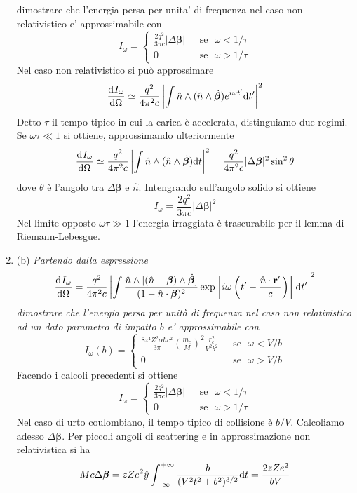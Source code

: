 \documentclass{article}
\renewcommand{\b}{(b)}
\renewcommand{\t}[1]{\textit{ #1}}
\renewcommand{\vec}[1]{\mathbf{#1}}
\begin{document}
\begin{enumerate}
{		dimostrare che
		l’energia persa per unita’ di frequenza nel caso non relativistico e’ approssimabile
		con \[I_\omega=\begin{cases}
		\frac{2q^2}{3\pi c}\left|\Delta\bm{\beta}\right|&\textrm{ }\mathrm{se}\textrm{ }\omega<1/\tau\\0&\textrm{ }\mathrm{se}\textrm{ }\omega>1/\tau
		\end{cases}\]} Nel caso non relativistico si può approssimare
	\[\dfrac{\mathrm{d} ^{}I_\omega}{\mathrm{d} {\Omega}^{}}\simeq\frac{q^2}{4\pi^2c}\left|\int\hat{n}\wedge(\hat{n}\wedge\dot{\bm\beta})e^{i\omega t'}\mathrm{d} t'\right|^2\]
	Detto $\tau$ il tempo tipico in cui la carica è accelerata, distinguiamo due regimi. Se $\omega\tau\ll 1$ si ottiene, approssimando ulteriormente
	\[\dfrac{\mathrm{d} ^{}I_\omega}{\mathrm{d} {\Omega}^{}}\simeq\frac{q^2}{4\pi^2c}\left|\int\hat{n}\wedge(\hat{n}\wedge\dot{\bm\beta})\mathrm{d} t\right|^2=\frac{q^2}{4\pi^2 c}|\Delta\bm\beta|^2\sin^2\theta\]
	dove $\theta$ è l'angolo tra $\Delta\bm\beta$ e $\hat{n}$. Intengrando sull'angolo solido si ottiene
	\[I_\omega=\frac{2q^2}{3\pi c}|\Delta\bm\beta|^2\]
	Nel limite opposto $\omega\tau\gg1$ l'energia irraggiata è trascurabile per il lemma di Riemann-Lebesgue. 
	\item\b\t{Partendo dalla espressione
		\[\der{I_\omega}{\Omega}=\frac{q^2}{4\pi^2c}\left|\int\frac{\hat{n}\wedge[(\hat{n}-\bm{\beta})\wedge\dot{\bm{\beta}}]}{(1-\hat{n}\cdot\bm{\beta})^2}\exp\left[i\omega\left(t'-\frac{\hat{n}\cdot\vec{r}'}{c}\right)\right]\d t'\right|^2\]
		dimostrare che
		l’energia persa per unità di frequenza nel caso non relativistico ad un dato
		parametro di impatto $b$ e’ approssimabile con \[I_\omega(b)=\begin{cases}
		\frac{8z^4Z^2\alpha\hbar c^2}{3\pi}\left(\frac{m_e}{M}\right)^2\frac{r_e^2}{V^2b^2}&\textrm{ }\mathrm{se}\textrm{ }\omega<V/b\\0&\textrm{ }\mathrm{se}\textrm{ }\omega>V/b
		\end{cases}\]}
		Facendo i calcoli precedenti si ottiene
		\[I_\omega=\begin{cases}
		\frac{2q^2}{3\pi c}\left|\Delta\bm{\beta}\right|&\textrm{ }\mathrm{se}\textrm{ }\omega<1/\tau\\0&\textrm{ }\mathrm{se}\textrm{ }\omega>1/\tau
		\end{cases}\]
		Nel caso di urto coulombiano, il tempo tipico di collisione è $b/V$. Calcoliamo adesso $\Delta\bm\beta$. Per piccoli angoli di scattering e in approssimazione non relativistica si ha
		\[Mc\Delta\bm\beta=zZe^2\hat{y}\int_{-\infty}^{+\infty}\frac{b}{(V^2t^2+b^2)^{3/2}}\mathrm{d} t=\frac{2zZe^2}{bV}\]

\end{enumerate}
\end{document}
